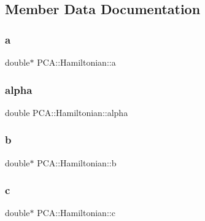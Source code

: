 \subsection{Member Data Documentation}
\hypertarget{class_p_c_a_1_1_hamiltonian_aec8578a7d250be77a3e2eb84718815c7}{}\label{class_p_c_a_1_1_hamiltonian_aec8578a7d250be77a3e2eb84718815c7} 
\subsubsection{\texorpdfstring{a}{a}}
{\footnotesize\ttfamily double$\ast$ P\+C\+A\+::\+Hamiltonian\+::a\hspace{0.3cm}{\ttfamily [private]}}

\hypertarget{class_p_c_a_1_1_hamiltonian_a71a66a52512faafc9bc8594d96f02e5f}{}\label{class_p_c_a_1_1_hamiltonian_a71a66a52512faafc9bc8594d96f02e5f} 
\subsubsection{\texorpdfstring{alpha}{alpha}}
{\footnotesize\ttfamily double P\+C\+A\+::\+Hamiltonian\+::alpha\hspace{0.3cm}{\ttfamily [private]}}

\hypertarget{class_p_c_a_1_1_hamiltonian_ac3a46f259db252d1b3a4ddbf40422026}{}\label{class_p_c_a_1_1_hamiltonian_ac3a46f259db252d1b3a4ddbf40422026} 
\subsubsection{\texorpdfstring{b}{b}}
{\footnotesize\ttfamily double$\ast$ P\+C\+A\+::\+Hamiltonian\+::b\hspace{0.3cm}{\ttfamily [private]}}

\hypertarget{class_p_c_a_1_1_hamiltonian_ada70e13b8ae935e2109179d50fcfaa2f}{}\label{class_p_c_a_1_1_hamiltonian_ada70e13b8ae935e2109179d50fcfaa2f} 
\subsubsection{\texorpdfstring{c}{c}}
{\footnotesize\ttfamily double$\ast$ P\+C\+A\+::\+Hamiltonian\+::c\hspace{0.3cm}{\ttfamily [private]}}

